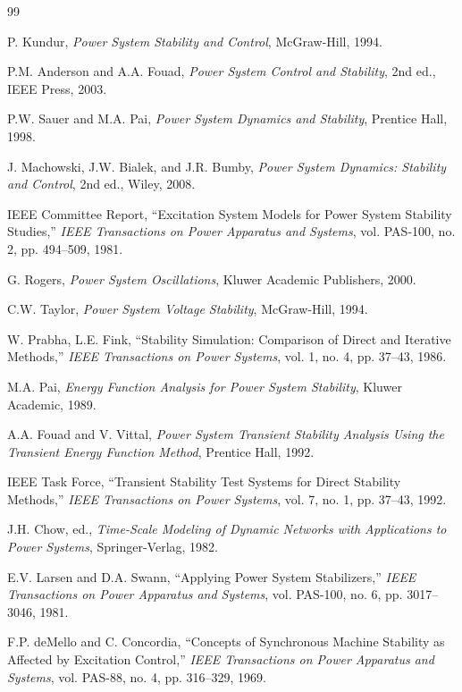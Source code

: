 \documentclass[11pt,a4paper]{article}
\begin{document}
\begin{thebibliography}{99}

P. Kundur, \textit{Power System Stability and Control}, McGraw-Hill, 1994.

P.M. Anderson and A.A. Fouad, \textit{Power System Control and Stability}, 2nd ed., IEEE Press, 2003.

P.W. Sauer and M.A. Pai, \textit{Power System Dynamics and Stability}, Prentice Hall, 1998.

J. Machowski, J.W. Bialek, and J.R. Bumby, \textit{Power System Dynamics: Stability and Control}, 2nd ed., Wiley, 2008.

IEEE Committee Report, ``Excitation System Models for Power System Stability Studies,'' \textit{IEEE Transactions on Power Apparatus and Systems}, vol. PAS-100, no. 2, pp. 494--509, 1981.

G. Rogers, \textit{Power System Oscillations}, Kluwer Academic Publishers, 2000.

C.W. Taylor, \textit{Power System Voltage Stability}, McGraw-Hill, 1994.

W. Prabha, L.E. Fink, ``Stability Simulation: Comparison of Direct and Iterative Methods,'' \textit{IEEE Transactions on Power Systems}, vol. 1, no. 4, pp. 37--43, 1986.

M.A. Pai, \textit{Energy Function Analysis for Power System Stability}, Kluwer Academic, 1989.

A.A. Fouad and V. Vittal, \textit{Power System Transient Stability Analysis Using the Transient Energy Function Method}, Prentice Hall, 1992.

IEEE Task Force, ``Transient Stability Test Systems for Direct Stability Methods,'' \textit{IEEE Transactions on Power Systems}, vol. 7, no. 1, pp. 37--43, 1992.

J.H. Chow, ed., \textit{Time-Scale Modeling of Dynamic Networks with Applications to Power Systems}, Springer-Verlag, 1982.

E.V. Larsen and D.A. Swann, ``Applying Power System Stabilizers,'' \textit{IEEE Transactions on Power Apparatus and Systems}, vol. PAS-100, no. 6, pp. 3017--3046, 1981.

F.P. deMello and C. Concordia, ``Concepts of Synchronous Machine Stability as Affected by Excitation Control,'' \textit{IEEE Transactions on Power Apparatus and Systems}, vol. PAS-88, no. 4, pp. 316--329, 1969.


\end{thebibliography}
\end{document}
